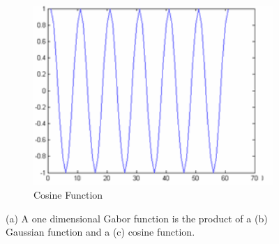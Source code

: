 \begin{figure}[h]
        \begin{subfigure}[b]{0.3\textwidth}
                \centering
                \includegraphics[width=1.0\textwidth]{figures/LitreatureReview/CosineFunction.png}
                \caption{Cosine Function}
                \label{fig:gaus}
        \end{subfigure}
        \caption[Example of a 1D Gabor Function]{(a) A one dimensional Gabor function is the product of a (b) Gaussian function and a (c) cosine function.}
        \label{fig:1DGabor}
\end{figure}

